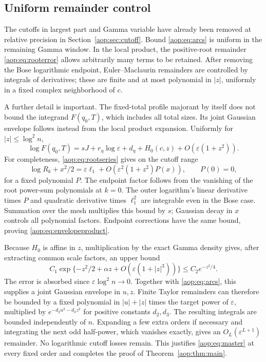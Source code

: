 \documentclass[11pt]{article}
\theoremstyle{remark}\newtheorem{remark}[theorem]{Remark}
\newcommand{\eps}{\varepsilon}
\begin{document}
\subsection{Uniform remainder control}

The cutoffs in largest part and Gamma variable have already been removed
at relative precision in Section~\ref{aop:sec:cutoff}. Bound \eqref{aop:eq:arcs}
is uniform in the remaining Gamma window. In the local product, the
positive-root remainder \eqref{aop:eq:rooterror} allows arbitrarily many
terms to be retained. After removing the Bose logarithmic endpoint,
Euler--Maclaurin remainders are controlled by integrals of derivatives;
these are finite and at most polynomial in $|z|$, uniformly in a fixed
complex neighborhood of $c$.

A further detail is important. The fixed-total profile majorant by
itself does not bound the integrand $F(q_0,T)$, which includes all total
sizes. Its joint Gaussian envelope follows instead from the local
product expansion. Uniformly for $|z|\le\log^2 n$,
\begin{equation}\label{aop:eq:envelopeproduct}
 \log F(q_0,T)=sJ+r_\eta\log\eps+d_\eta+H_0(c,z)
                 +O(\eps(1+z^2)).
\end{equation}
For completeness, \eqref{aop:eq:rootseries} gives on the cutoff range
\[
 \log R_k+x^2/2=\eps\ell_1+O(\eps^2(1+z^2)P(x)),\qquad P(0)=0,
\]
for a fixed polynomial $P$. The endpoint factor follows from the
vanishing of the root power-sum polynomials at $k=0$. The outer
logarithm's linear derivative times $P$ and quadratic derivative times
$\ell_1^2$ are integrable even in the Bose case. Summation over the
mesh multiplies this bound by $s$; Gaussian decay in $x$ controls all
polynomial factors. Endpoint corrections have the same bound, proving
\eqref{aop:eq:envelopeproduct}.

Because $H_0$ is affine in $z$, multiplication by the exact Gamma
density gives, after extracting common scale factors, an upper bound
\[
 C_1\exp\{-z^2/2+\alpha z+O(\eps(1+|z|^3))\}
          \le C_2e^{-z^2/4}.
\]
The error is absorbed since $\eps\log^2 n\to0$. Together with
\eqref{aop:eq:arcs}, this supplies a joint Gaussian envelope in $u,z$.
Finite Taylor remainders can therefore be bounded by a fixed polynomial
in $|u|+|z|$ times the target power of $\eps$, multiplied by
$e^{-d_2u^2-d_3z^2}$ for positive constants $d_2,d_3$.
The resulting integrals are bounded independently of $n$.
Expanding a few extra orders if necessary and integrating the next odd
half-power, which vanishes exactly, gives an $O_L(\eps^{L+1})$
remainder. No logarithmic cutoff losses remain. This justifies
\eqref{aop:eq:master} at every fixed order and completes the proof of
Theorem~\ref{aop:thm:main}.
\end{document}
